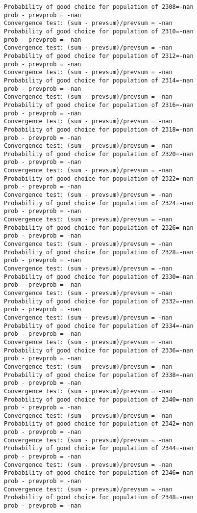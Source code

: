 \documentclass[11pt,onecolumn]{article}
\begin{document}
\begin{verbatim}
Probability of good choice for population of 2308=-nan
prob - prevprob = -nan
Convergence test: (sum - prevsum)/prevsum = -nan
Probability of good choice for population of 2310=-nan
prob - prevprob = -nan
Convergence test: (sum - prevsum)/prevsum = -nan
Probability of good choice for population of 2312=-nan
prob - prevprob = -nan
Convergence test: (sum - prevsum)/prevsum = -nan
Probability of good choice for population of 2314=-nan
prob - prevprob = -nan
Convergence test: (sum - prevsum)/prevsum = -nan
Probability of good choice for population of 2316=-nan
prob - prevprob = -nan
Convergence test: (sum - prevsum)/prevsum = -nan
Probability of good choice for population of 2318=-nan
prob - prevprob = -nan
Convergence test: (sum - prevsum)/prevsum = -nan
Probability of good choice for population of 2320=-nan
prob - prevprob = -nan
Convergence test: (sum - prevsum)/prevsum = -nan
Probability of good choice for population of 2322=-nan
prob - prevprob = -nan
Convergence test: (sum - prevsum)/prevsum = -nan
Probability of good choice for population of 2324=-nan
prob - prevprob = -nan
Convergence test: (sum - prevsum)/prevsum = -nan
Probability of good choice for population of 2326=-nan
prob - prevprob = -nan
Convergence test: (sum - prevsum)/prevsum = -nan
Probability of good choice for population of 2328=-nan
prob - prevprob = -nan
Convergence test: (sum - prevsum)/prevsum = -nan
Probability of good choice for population of 2330=-nan
prob - prevprob = -nan
Convergence test: (sum - prevsum)/prevsum = -nan
Probability of good choice for population of 2332=-nan
prob - prevprob = -nan
Convergence test: (sum - prevsum)/prevsum = -nan
Probability of good choice for population of 2334=-nan
prob - prevprob = -nan
Convergence test: (sum - prevsum)/prevsum = -nan
Probability of good choice for population of 2336=-nan
prob - prevprob = -nan
Convergence test: (sum - prevsum)/prevsum = -nan
Probability of good choice for population of 2338=-nan
prob - prevprob = -nan
Convergence test: (sum - prevsum)/prevsum = -nan
Probability of good choice for population of 2340=-nan
prob - prevprob = -nan
Convergence test: (sum - prevsum)/prevsum = -nan
Probability of good choice for population of 2342=-nan
prob - prevprob = -nan
Convergence test: (sum - prevsum)/prevsum = -nan
Probability of good choice for population of 2344=-nan
prob - prevprob = -nan
Convergence test: (sum - prevsum)/prevsum = -nan
Probability of good choice for population of 2346=-nan
prob - prevprob = -nan
Convergence test: (sum - prevsum)/prevsum = -nan
Probability of good choice for population of 2348=-nan
prob - prevprob = -nan

\end{verbatim}
\end{document}

